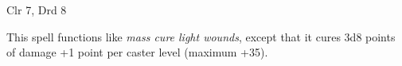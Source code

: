 
\begin{description*}
\item[Level:] Clr 7, Drd 8
\end{description*}

This spell functions like \textit{mass cure light wounds}, except that it cures
3d8 points of damage +1 point per caster level (maximum +35).